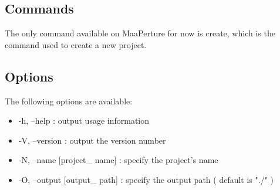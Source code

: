 \subsection{Commands}
\label{commands}
The only command available on MaaPerture for now is create, which is the command used to create a new project.

\subsection{Options}
\label{options}
The following options are available:
\begin{itemize}
\item -h, --help    :              output usage information
\item -V, --version  :             output the version number
\item -N, --name [project\_ name] :  specify the project's name
\item -O, --output [output\_ path] : specify the output path ( default is "./" )
\end{itemize}


